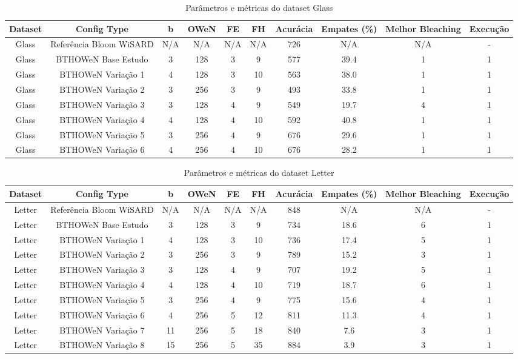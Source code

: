 \documentclass{article}
\begin{document}
\begin{longtable}{|c|c|c|c|c|c|c|c|c|c|}
\caption{Parâmetros e métricas do dataset Glass} \\
\hline
\textbf{Dataset} & \textbf{Config Type} & \textbf{b} & \textbf{OWeN} & \textbf{FE} & \textbf{FH} & \textbf{Acurácia} & \textbf{Empates (\%)} & \textbf{Melhor Bleaching} & \textbf{Execução} \\
\hline
Glass & Referência Bloom WiSARD & N/A & N/A & N/A & N/A & 726 & N/A & N/A & - \\
\hline
Glass & BTHOWeN Base Estudo & 3 & 128 & 3 & 9 & 577 & 39.4 & 1 & 1 \\
\hline
Glass & BTHOWeN Variação 1 & 4 & 128 & 3 & 10 & 563 & 38.0 & 1 & 1 \\
\hline
Glass & BTHOWeN Variação 2 & 3 & 256 & 3 & 9 & 493 & 33.8 & 1 & 1 \\
\hline
Glass & BTHOWeN Variação 3 & 3 & 128 & 4 & 9 & 549 & 19.7 & 4 & 1 \\
\hline
Glass & BTHOWeN Variação 4 & 4 & 128 & 4 & 10 & 592 & 40.8 & 1 & 1 \\
\hline
Glass & BTHOWeN Variação 5 & 3 & 256 & 4 & 9 & 676 & 29.6 & 1 & 1 \\
\hline
Glass & BTHOWeN Variação 6 & 4 & 256 & 4 & 10 & 676 & 28.2 & 1 & 1 \\
\hline
\end{longtable}

\begin{longtable}{|c|c|c|c|c|c|c|c|c|c|}
\caption{Parâmetros e métricas do dataset Letter} \\
\hline
\textbf{Dataset} & \textbf{Config Type} & \textbf{b} & \textbf{OWeN} & \textbf{FE} & \textbf{FH} & \textbf{Acurácia} & \textbf{Empates (\%)} & \textbf{Melhor Bleaching} & \textbf{Execução} \\
\hline
Letter & Referência Bloom WiSARD & N/A & N/A & N/A & N/A & 848 & N/A & N/A & - \\
\hline
Letter & BTHOWeN Base Estudo & 3 & 128 & 3 & 9 & 734 & 18.6 & 6 & 1 \\
\hline
Letter & BTHOWeN Variação 1 & 4 & 128 & 3 & 10 & 736 & 17.4 & 5 & 1 \\
\hline
Letter & BTHOWeN Variação 2 & 3 & 256 & 3 & 9 & 789 & 15.2 & 3 & 1 \\
\hline
Letter & BTHOWeN Variação 3 & 3 & 128 & 4 & 9 & 707 & 19.2 & 5 & 1 \\
\hline
Letter & BTHOWeN Variação 4 & 4 & 128 & 4 & 10 & 719 & 18.7 & 6 & 1 \\
\hline
Letter & BTHOWeN Variação 5 & 3 & 256 & 4 & 9 & 775 & 15.6 & 4 & 1 \\
\hline
Letter & BTHOWeN Variação 6 & 4 & 256 & 5 & 12 & 811 & 11.3 & 4 & 1 \\
\hline
Letter & BTHOWeN Variação 7 & 11 & 256 & 5 & 18 & 840 & 7.6 & 3 & 1 \\
\hline
Letter & BTHOWeN Variação 8 & 15 & 256 & 5 & 35 & 884 & 3.9 & 3 & 1 \\
\hline
\end{longtable}
\end{document}
